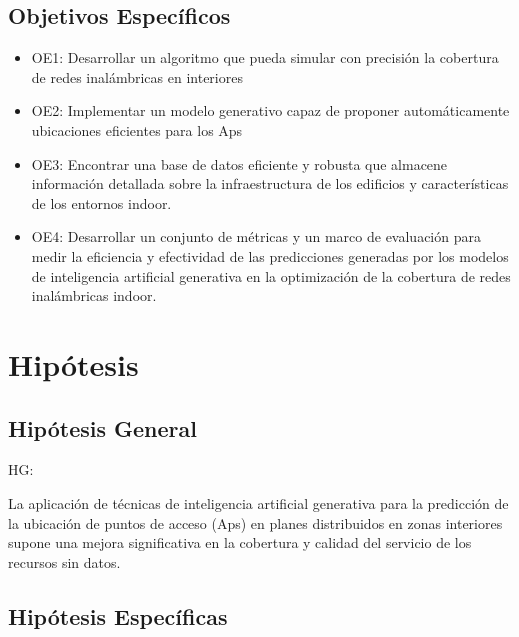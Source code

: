 \subsection{Objetivos Específicos}
\newcommand{\Objone}{
Desarrollar un algoritmo que pueda simular con precisión la cobertura de redes inalámbricas en interiores
}
\newcommand{\Objtwo}{
Implementar un modelo generativo capaz de proponer automáticamente ubicaciones eficientes para los Aps
}
\newcommand{\Objthree}{
Encontrar una base de datos eficiente y robusta que almacene información detallada sobre la infraestructura de los edificios y características de los entornos indoor.
}
\newcommand{\Objfour}{
Desarrollar un conjunto de métricas y un marco de evaluación para medir la eficiencia y efectividad de las predicciones generadas por los modelos de inteligencia artificial generativa en la optimización de la cobertura de redes inalámbricas indoor.
}

\begin{itemize}
	\item OE1: {\Objone}
	\item OE2: {\Objtwo}
	\item OE3: {\Objthree}
	\item OE4: {\Objfour}
\end{itemize}

\section{Hipótesis}

\subsection{Hipótesis General}
HG: \newcommand{\HipotesisGeneral}{
	La aplicación de técnicas de inteligencia artificial generativa para la predicción de la ubicación de puntos de acceso (Aps) en planes distribuidos en zonas interiores supone una mejora significativa en la cobertura y calidad del servicio de los recursos sin datos.
}
\HipotesisGeneral
\subsection{Hipótesis Específicas}
\newcommand{\Hone}{
	Los algoritmos de inteligencia artificial generativa, como las GAN, se pueden utilizar para predecir con precisión la ubicación óptima de los puntos de acceso (AP) en un entorno interior. 
}
\newcommand{\Htwo}{
	La combinación de datos de sensores de señales inalámbricos con datos como planos arquitectónicos mejoran la precisión y predicción de la ubicación de AP mediante inteligencia artificial generativa.
}
\newcommand{\Hthree}{
	Una base de datos bien gestionada y enriquecida con datos contextuales permitirá validar las predicciones de los modelos de IA de manera más fiable, comparando las ubicaciones sugeridas con las condiciones reales y mejorando la precisión de futuras predicciones.
}
\newcommand{\Hfour}{
	La implementación de un marco de evaluación estandarizado permitirá comparar de manera objetiva diferentes enfoques y modelos de IA, facilitando la selección de los más efectivos para optimizar la cobertura de redes inalámbricas en distintos entornos indoor.
}


